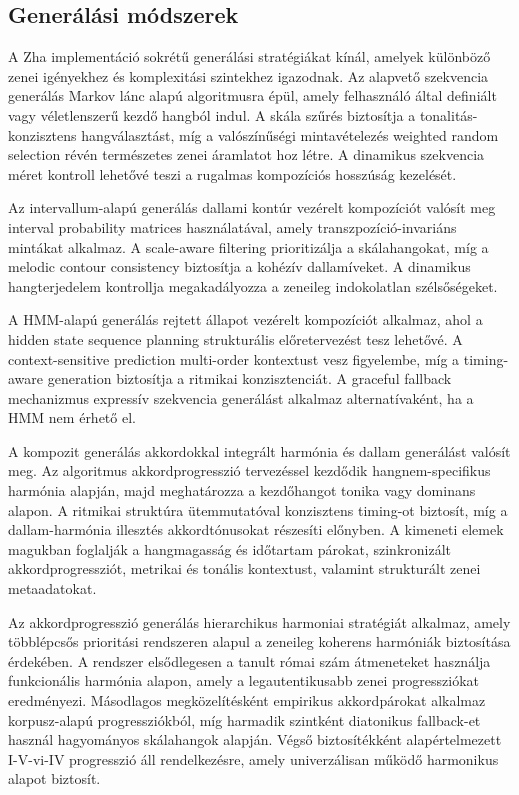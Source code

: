 \subsection{Generálási módszerek}

A Zha implementáció sokrétű generálási stratégiákat kínál, amelyek különböző zenei igényekhez és komplexitási szintekhez igazodnak. Az alapvető szekvencia generálás Markov lánc alapú algoritmusra épül, amely felhasználó által definiált vagy véletlenszerű kezdő hangból indul. A skála szűrés biztosítja a tonalitás-konzisztens hangválasztást, míg a valószínűségi mintavételezés weighted random selection révén természetes zenei áramlatot hoz létre. A dinamikus szekvencia méret kontroll lehetővé teszi a rugalmas kompozíciós hosszúság kezelését.

Az intervallum-alapú generálás dallami kontúr vezérelt kompozíciót valósít meg interval probability matrices használatával, amely transzpozíció-invariáns mintákat alkalmaz. A scale-aware filtering prioritizálja a skálahangokat, míg a melodic contour consistency biztosítja a kohézív dallamíveket. A dinamikus hangterjedelem kontrollja megakadályozza a zeneileg indokolatlan szélsőségeket.

A HMM-alapú generálás rejtett állapot vezérelt kompozíciót alkalmaz, ahol a hidden state sequence planning strukturális előretervezést tesz lehetővé. A context-sensitive prediction multi-order kontextust vesz figyelembe, míg a timing-aware generation biztosítja a ritmikai konzisztenciát. A graceful fallback mechanizmus expressív szekvencia generálást alkalmaz alternatívaként, ha a HMM nem érhető el.

A kompozit generálás akkordokkal integrált harmónia és dallam generálást valósít meg. Az algoritmus akkordprogresszió tervezéssel kezdődik hangnem-specifikus harmónia alapján, majd meghatározza a kezdőhangot tonika vagy dominans alapon. A ritmikai struktúra ütemmutatóval konzisztens timing-ot biztosít, míg a dallam-harmónia illesztés akkordtónusokat részesíti előnyben. A kimeneti elemek magukban foglalják a hangmagasság és időtartam párokat, szinkronizált akkordprogressziót, metrikai és tonális kontextust, valamint strukturált zenei metaadatokat.

Az akkordprogresszió generálás hierarchikus harmoniai stratégiát alkalmaz, amely többlépcsős prioritási rendszeren alapul a zeneileg koherens harmóniák biztosítása érdekében. A rendszer elsődlegesen a tanult római szám átmeneteket használja funkcionális harmónia alapon, amely a legautentikusabb zenei progressziókat eredményezi. Másodlagos megközelítésként empirikus akkordpárokat alkalmaz korpusz-alapú progressziókból, míg harmadik szintként diatonikus fallback-et használ hagyományos skálahangok alapján. Végső biztosítékként alapértelmezett I-V-vi-IV progresszió áll rendelkezésre, amely univerzálisan működő harmonikus alapot biztosít.

